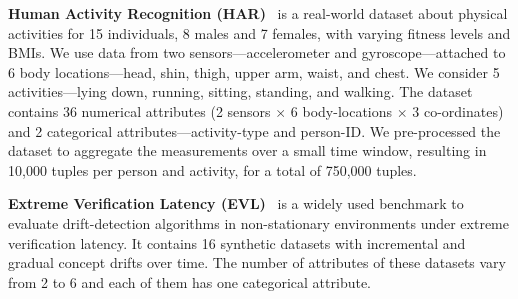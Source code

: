 \smallskip

%
%

\noindent {} \textbf{Human Activity Recognition
(HAR)}~\cite{sztyler2016onbody} is a real-world dataset about physical
activities for 15 individuals, 8 males and 7 females, with varying fitness
levels and BMIs. We use data from two sensors---accelerometer and
gyroscope---attached to 6 body locations---head, shin, thigh, upper arm, waist,
and chest. We consider 5 activities---lying down, running, sitting, standing,
and walking. The dataset contains 36 numerical attributes (2 sensors $\times$ 6
body-locations $\times$ 3 co-ordinates) and 2 categorical
attributes---activity-type and person-ID. We pre-processed the dataset to
aggregate the measurements over a small time window, resulting in 10,000 tuples
per person and activity, for a total of 750,000 tuples.


\smallskip

\noindent\textbf{Extreme Verification Latency (EVL)}~\cite{souzaSDM:2015}
is a widely used benchmark to evaluate drift-detection algorithms in
non-stationary environments under extreme verification latency. It contains 16
synthetic datasets with incremental and gradual concept drifts over time. The
number of attributes of these datasets vary from 2 to 6 and each of them has
one categorical attribute.

